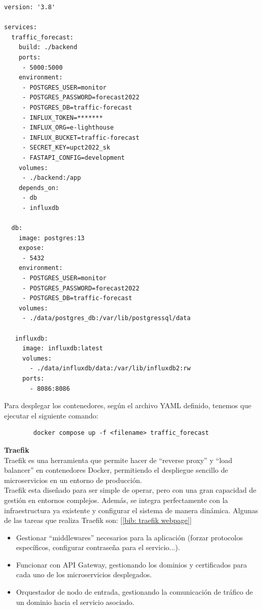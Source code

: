 \documentclass[a4paper, oneside, 12pt]{book}
\begin{document}
	\begin{lstlisting}[style=yaml, caption={Archivo configuración de contenedores para entorno de desarrollo.}]
version: '3.8'

services:
  traffic_forecast:
    build: ./backend
    ports:
     - 5000:5000
    environment:
     - POSTGRES_USER=monitor
     - POSTGRES_PASSWORD=forecast2022
     - POSTGRES_DB=traffic-forecast
     - INFLUX_TOKEN=*******
     - INFLUX_ORG=e-lighthouse
     - INFLUX_BUCKET=traffic-forecast
     - SECRET_KEY=upct2022_sk
     - FASTAPI_CONFIG=development
    volumes:
     - ./backend:/app
    depends_on:
     - db
     - influxdb

  db:
    image: postgres:13
    expose:
     - 5432
    environment:
     - POSTGRES_USER=monitor
     - POSTGRES_PASSWORD=forecast2022
     - POSTGRES_DB=traffic-forecast
    volumes:
     - ./data/postgres_db:/var/lib/postgressql/data
    
   influxdb:
     image: influxdb:latest
     volumes:
       - ./data/influxdb/data:/var/lib/influxdb2:rw
     ports:
       - 8086:8086
	\end{lstlisting}

	\pagebreak
	
	\noindent Para desplegar los contenedores, según el archivo YAML definido, tenemos que ejecutar el siguiente comando: 
	
	\begin{verbatim}
		docker compose up -f <filename> traffic_forecast
	\end{verbatim}
	
	\noindent \textbf{\large Traefik} \\
	
	\noindent Traefik es una herramienta que permite hacer de ``reverse proxy'' y ``load balancer'' en contenedores Docker, permitiendo el despliegue sencillo de microservicios en un entorno de producción. \\
	
	\noindent Traefik esta diseñado para ser simple de operar, pero con una gran capacidad de gestión en entornos complejos. Además, se integra perfectamente con la infraestructura ya existente y configurar el sistema de manera dinámica. Algunas de las tareas que realiza Traefik son: [\ref{bib: traefik webpage}] 
	
	\begin{itemize}
		\item Gestionar ``middlewares'' necesarios para la aplicación (forzar protocolos específicos, configurar contraseña para el servicio...).
		\item Funcionar con API Gateway, gestionando los dominios y certificados para cada uno de los microservicios desplegados.
		\item Orquestador de nodo de entrada, gestionando la comunicación de tráfico de un dominio hacia el servicio asociado.
	\end{itemize}
\end{document}
